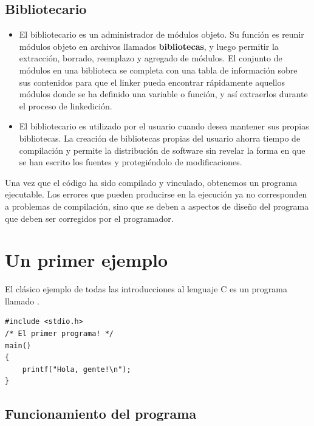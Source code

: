 \subsection{Bibliotecario}
\begin{itemize}
	\item El bibliotecario es un administrador de módulos objeto. Su función
es reunir módulos objeto en archivos llamados \textbf{bibliotecas}, y luego
permitir la extracción, borrado, reemplazo y agregado de módulos.
El conjunto de módulos en una biblioteca se completa con una tabla de
información sobre sus contenidos para que el linker pueda encontrar
rápidamente aquellos módulos donde se ha definido una variable o
función, y así extraerlos durante el proceso de linkedición. 
\item El
bibliotecario es utilizado por el usuario cuando desea mantener sus
propias bibliotecas. La creación de bibliotecas propias del usuario
ahorra tiempo de compilación y permite la distribución de software
sin revelar la forma en que se han escrito los fuentes y
protegiéndolo de modificaciones. 
\end{itemize}
Una vez que el código ha sido compilado y vinculado, obtenemos un programa ejecutable. Los errores que pueden producirse en la ejecución ya no corresponden a problemas de compilación, sino que se deben a aspectos de diseño del programa que deben ser corregidos por el programador.

\section{Un primer ejemplo}

El clásico ejemplo de todas las introducciones al lenguaje C es un programa llamado .

\begin{lstlisting}
#include <stdio.h>
/* El primer programa! */
main()
{
	printf("Hola, gente!\n");
}
\end{lstlisting}

\subsection{Funcionamiento del programa}

